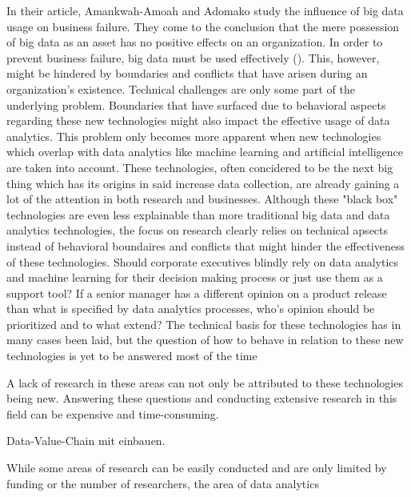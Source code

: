In their article, Amankwah-Amoah and Adomako study the influence of big data usage on business failure. 
They come to the conclusion that the mere possession of big data as an asset has no positive effects on an organization. In order to prevent business failure, big data must be used effectively  (\cite{AmankwahAmoah.2019}). This, however, might be hindered by boundaries and conflicts that have arisen during an organization's existence. Technical challenges are only some part of the underlying problem. Boundaries that have surfaced due to behavioral aspects regarding these new technologies might also impact the effective usage of data analytics. This problem only becomes more apparent when new technologies which overlap with data analytics like machine learning and artificial intelligence are taken into account. These technologies, often concidered to be the next big thing which has its origins in said increase data collection, are already gaining a lot of the attention in both research and businesses. Although these "black box" technologies are even less explainable than more traditional big data and data analytics technologies, the focus on research clearly relies on technical apsects instead of behavioral boundaires and conflicts that might hinder the effectiveness of these technologies. Should corporate executives blindly rely on data analytics and machine learning for their decision making process or just use them as a support tool? If a senior manager has a different opinion on a product release than what is specified by data analytics processes, who's opinion should be prioritized and to what extend? The technical basis for these technologies has in many cases been laid, but the question of how to behave in relation to these new technologies is yet to be answered most of the time %

A lack of research in these areas can not only be attributed to these technologies being new. Answering these questions and conducting extensive research in this field can be expensive and time-consuming.

Data-Value-Chain mit einbauen.

While some areas of research can be easily conducted and are only limited by funding or the number of researchers, the area of data analytics 





